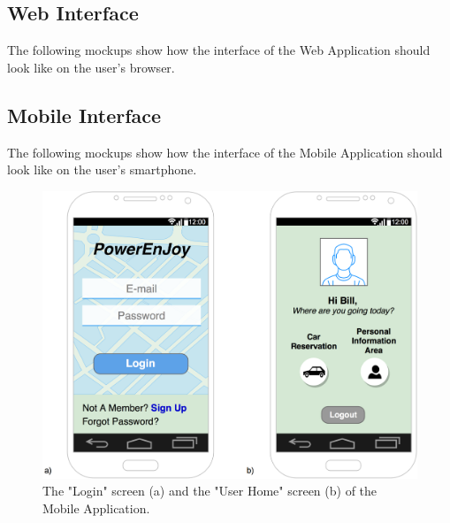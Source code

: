\subsection{Web Interface}
The following mockups show how the interface of the Web Application should look like on the user's browser.

\subsection{Mobile Interface}
The following mockups show how the interface of the Mobile Application should look like on the user's smartphone.

\begin{figure}[h]
\centering
		\includegraphics[width=\textwidth]{./user_interface_design/diagrams/mobile_login_home.png}
		\caption{The "Login" screen (a) and the "User Home" screen (b) of the Mobile Application.}
		\label{mobile_login_home}
\end{figure}

